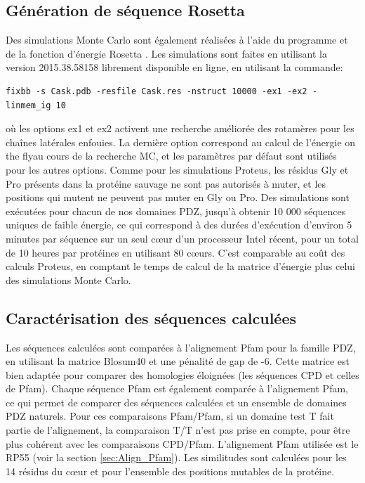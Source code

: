 \subsection{Génération de séquence Rosetta}

Des simulations Monte Carlo sont également réalisées à l'aide du programme et de la fonction d'énergie Rosetta \cite{Baker06}. Les simulations sont faites en utilisant la version 2015.38.58158 librement disponible en ligne, en utilisant la commande:
\begin{verbatim}
fixbb -s Cask.pdb -resfile Cask.res -nstruct 10000 -ex1 -ex2 -linmem_ig 10
\end{verbatim} 
où les options ex1 et ex2 activent une recherche améliorée des rotamères pour les chaînes latérales enfouies. La dernière option correspond au calcul de l'énergie \og on the fly\fg au cours de la recherche MC, et les paramètres par défaut sont utilisés pour les autres options. Comme pour les simulations Proteus, les résidus Gly et Pro présents dans la protéine sauvage ne sont pas autorisés à muter, et les positions qui mutent ne peuvent pas muter en Gly ou Pro. Des simulations sont exécutées pour chacun de nos domaines PDZ, jusqu'à obtenir 10 000 séquences uniques de faible énergie, ce qui correspond à des durées d'exécution d'environ 5 minutes par séquence sur un seul cœur d'un processeur Intel récent, pour un total de 10 heures par protéines en utilisant 80 cœurs. C'est comparable au coût des calculs Proteus, en comptant le temps de calcul de la matrice d'énergie plus celui des simulations Monte Carlo.

\subsection{Caractérisation des séquences calculées}

Les séquences calculées sont comparées à l'alignement Pfam pour la famille PDZ, en utilisant la matrice Blosum40 et une pénalité de gap de -6. Cette matrice est bien adaptée pour comparer des homologies éloignées (les séquences CPD et celles de Pfam). Chaque séquence Pfam est également comparée à l'alignement Pfam, ce qui permet de comparer des séquences calculées et un ensemble de domaines PDZ naturels. Pour ces comparaisons Pfam/Pfam, si un domaine test T fait partie de l'alignement, la comparaison T/T n'est pas prise en compte, pour être plus cohérent avec les comparaisons CPD/Pfam. L'alignement Pfam utilisée est le \og RP55 \fg (voir la section \ref{sec:Align_Pfam}). Les similitudes sont calculées pour les 14 résidus du cœur et pour l'ensemble des positions mutables de la protéine.

